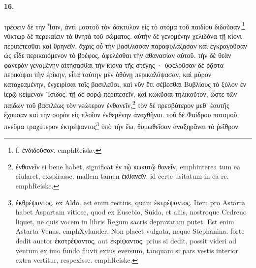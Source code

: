 \documentclass[a4paper, 11pt, oneside, polutonikogreek, german]{article}
\begin{document}
\paragraph{16.}
τρέφειν δὲ τὴν Ἶσιν, ἀντὶ μαστοῦ τὸν δάκτυλον εἰς τὸ στόμα τοῦ παιδίου διδοῦσαν,\footnote{f. ἐνδιδοῦσαν. emph{Reiske.}} νύκτωρ δὲ περικαίειν τὰ θνητὰ τοῦ σώματος. αὐτὴν δὲ γενομένην χελιδόνα τῇ κίονι περιπέτεσθαι καὶ θρηνεῖν, ἄχρις οὗ τὴν βασίλισσαν παραφυλάξασαν καὶ ἐγκραγοῦσαν ὡς εἶδε περικαιόμενον τὸ βρέφος, ἀφελέσθαι τὴν ἀθανασίαν αὐτοῦ. τὴν δὲ θεὰν φανερὰν γενομένην αἰτήσασθαι τὴν κίονα τῆς στέγης · ὑφελοῦσαν δὲ ῥᾷστα περικόψαι τὴν ἐρίκην, εἶτα ταύτην μὲν ὀθόνῃ περικαλύψασαν, καὶ μύρον καταχεαμένην, ἐγχειρίσαι τοῖς βασιλεῦσι, καὶ νῦν ἔτι σέβεσθαι Βυβλίους τὸ ξύλον ἐν ἱερῷ κείμενον Ἴσιδος. τῇ δὲ σορῷ περιπεσεῖν, καὶ κωκῦσαι τηλικοῦτον, ὥστε τῶν παίδων τοῦ βασιλέως τὸν νεώτερον ἐνθανεῖν,\footnote{ἐνθανεῖν si bene habet, significat ἐν τῷ κωκυτῷ θανεῖν, emph{interea tum ea eiularet, exspirasse}. mallem tamen ἐκθανεῖν. id certe usitatum in ea re. emph{Reiske.}} τὸν δὲ πρεσβύτερον μεθ' ἑαυτῆς ἔχουσαν καὶ τὴν σορὸν εἰς πλοῖον ἐνθεμένην ἀναχθῆναι. τοῦ δὲ Φαίδρου ποταμοῦ πνεῦμα τραχύτερον ἐκτρέψαντος\footnote{ἐκθρέψαντος. ex Aldo. est enim rectius, quam ἐκτρέψαντος. Item pro Astarta habet Aspartam vitiose, quod ex Eusebio, Suida, et aliis, nostroque Cedreno liquet, ne quis vocem in libris Regum sacris depravatam putet. Est enim Astarta Venus. emph{Xylander.} Non placet vulgata, neque Stephanina. forte dedit auctor ἐκστρέψαντος, aut ἐκρίψαντος. prius si dedit, possit videri ad ventum ex imo fundo fluvii extus eversum, tanquam si pars vestis interior extra vertitur, respexisse. emph{Reiske.}} ὑπὸ τὴν ἕω, θυμωθεῖσαν ἀναξηρᾶναι τὸ ῥεῖθρον.
\end{document}
